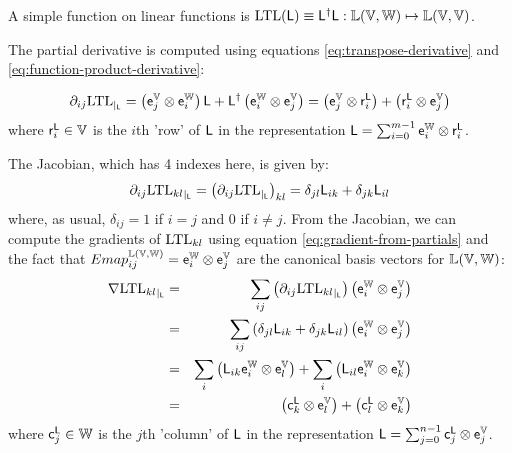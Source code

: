\leveldown{$\Lmap^{\dagger} \Lmap$}
\label{sec:LTL}

A simple function on linear functions
is $\mathrm{LTL}(\mathsf{L}) \equiv \mathsf{L}^{\dagger} \mathsf{L}
: \mathbb{L}(\mathbb{V},\mathbb{W}) \mapsto \mathbb{L}(\mathbb{V},\mathbb{V})$.

The partial derivative is computed using equations
\ref{eq:transpose-derivative}
and
\ref{eq:function-product-derivative}:

\begin{equation}
{\partial}_{ij}{\mathrm{LTL}}_{\mid_{\mathsf{L}}}
=
\left( \mathsf{e}_j^{\mathbb{V}} \otimes \mathsf{e}_i^{\mathbb{W}} \right) \mathsf{L}
+
\mathsf{L}^{\dagger} \left( \mathsf{e}_i^{\mathbb{W}} \otimes \mathsf{e}_j^{\mathbb{V}} \right)
=
\left( \mathsf{e}_j^{\mathbb{V}} \otimes \mathsf{r}_i^{\mathsf{L}} \right)
+
\left( \mathsf{r}_i^{\mathsf{L}} \otimes \mathsf{e}_j^{\mathbb{V}} \right)
\end{equation}
where $\mathsf{r}_i^{\mathsf{L}} \in \mathbb{V}$ is the $i$th 'row' of $\mathsf{L}$
in the representation $\mathsf{L} = \sum_{i=0}^{m-1} \mathsf{e}_i^{\mathbb{W}} \otimes \mathsf{r}_i^{\mathsf{L}}$.

The Jacobian, which has 4 indexes here, is given by:
\begin{equation}
{\partial}_{ij}{\mathrm{LTL}_{kl}}_{\mid_{\mathsf{L}}}
 =
\left( {\partial}_{ij}{\mathrm{LTL}}_{\mid_{\mathsf{L}}} \right)_{kl}
=
\delta_{jl} \mathsf{L}_{ik}
+
\delta_{jk} \mathsf{L}_{il}
\end{equation}
where, as usual, $\delta_{ij} = 1$ if $i=j$ and  $0$ if $i \neq j$.
From the Jacobian, we can compute the gradients of $\mathrm{LTL}_{kl}$
using equation \ref{eq:gradient-from-partials}
and the fact that
$Emap_{ij}^{\mathbb{L}(\mathbb{V},\mathbb{W})}  = \mathsf{e}_i^{\mathbb{W}} \otimes \mathsf{e}_j^{\mathbb{V}}$
are the canonical basis vectors for $\mathbb{L}(\mathbb{V},\mathbb{W})$:
\begin{eqnarray}
{\mathbf \nabla}{\mathrm{LTL}_{kl}}_{\mid_{\mathsf{L}}}
& = &
\sum_{ij}
\left( {\partial}_{ij}{\mathrm{LTL}_{kl}}_{\mid_{\mathsf{L}}} \right)
\left( \mathsf{e}_i^{\mathbb{W}} \otimes \mathsf{e}_j^{\mathbb{V}} \right)
\\
& = &
\sum_{ij}
\left( \delta_{jl} \mathsf{L}_{ik} + \delta_{jk} \mathsf{L}_{il} \right)
\left( \mathsf{e}_i^{\mathbb{W}} \otimes \mathsf{e}_j^{\mathbb{V}} \right)
\nonumber
\\
& = &
\sum_{i}
\left(
\mathsf{L}_{ik}  \mathsf{e}_i^{\mathbb{W}} \otimes \mathsf{e}_l^{\mathbb{V}}
\right)
+
\sum_{i}
\left(
\mathsf{L}_{il}  \mathsf{e}_i^{\mathbb{W}} \otimes \mathsf{e}_k^{\mathbb{V}}
\right)
\nonumber
\\
& = &
\left(
\mathsf{c}_k^{\mathsf{L}} \otimes \mathsf{e}_l^{\mathbb{V}}
\right)
+
\left(
\mathsf{c}_l^{\mathsf{L}} \otimes \mathsf{e}_k^{\mathbb{V}}
\right)
\nonumber
\end{eqnarray}
where $\mathsf{c}_j^{\mathsf{L}} \in \mathbb{W}$ is the $j$th 'column' of $\mathsf{L}$
in the representation
$\mathsf{L} = \sum_{j=0}^{n-1} \mathsf{c}_j^{\mathsf{L}} \otimes \mathsf{e}_j^{\mathbb{V}}$.

